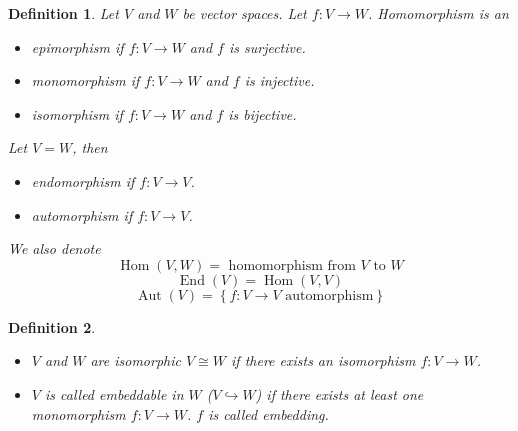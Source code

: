 \documentclass[a4paper,landscape,twocolumn]{article}
\newcommand\set[1]{\left\{#1\right\}}
\newtheorem{defi}{Definition}[section]
\DeclareMathOperator\Hom{Hom} %
\DeclareMathOperator\End{End} %
\DeclareMathOperator\Aut{Aut} %
\begin{document}
\begin{defi}
  Let $V$ and $W$ be vector spaces.
  Let $f: V \rightarrow W$. Homomorphism is an
  \begin{itemize}
    \item \emph{epimorphism} if $f: V \rightarrow W$ and $f$ is surjective.
    \item \emph{monomorphism} if $f: V \rightarrow W$ and $f$ is injective.
    \item \emph{isomorphism} if $f: V \rightarrow W$ and $f$ is bijective.
  \end{itemize}
  Let $V = W$, then
  \begin{itemize}
    \item \emph{endomorphism} if $f: V \rightarrow V$.
    \item \emph{automorphism} if $f: V \rightarrow V$.
  \end{itemize}
  We also denote
  \[ \Hom(V, W) = \text{ homomorphism from $V$ to $W$} \]
  \[ \End(V) = \Hom(V, V) \]
  \[ \Aut(V) = \set{f: V \rightarrow V \text{ automorphism}} \]
\end{defi}

\begin{defi}
  \begin{itemize}
    \item $V$ and $W$ are \emph{isomorphic} $V \cong W$ if there exists an isomorphism $f: V \rightarrow W$.
    \item
      $V$ is called \emph{embeddable} in $W$ ($V \hookrightarrow W$) if there exists at least one monomorphism $f: V \rightarrow W$.
      $f$ is called \emph{embedding}.
  \end{itemize}
\end{defi}
\end{document}
